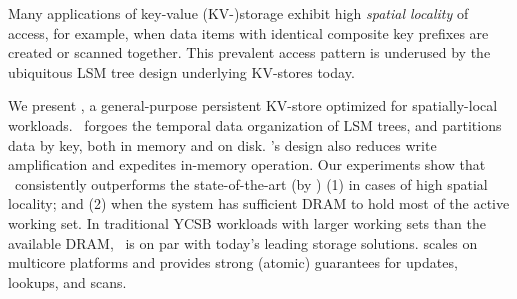 Many applications of key-value (KV-)storage exhibit high \emph{spatial locality}
of access, for example, when data items with identical composite key prefixes are created or scanned together.  
This prevalent access pattern is underused by the ubiquitous LSM tree design underlying KV-stores today.

We present \sys, a general-purpose persistent KV-store optimized for spatially-local workloads. 
\sys\ forgoes the temporal data organization of LSM trees, and partitions data by key, both in memory and on disk. 
%
\sys's design also reduces write amplification and expedites in-memory operation.
Our experiments show that \sys\ consistently outperforms the state-of-the-art (by  )
(1)  in cases of high spatial locality; and (2) when the system has sufficient DRAM to hold most of the active working set. 
In traditional YCSB workloads with larger working sets than the available  DRAM, \sys\ is on par with 
today's leading storage solutions.
\sys\/ scales on multicore platforms and provides strong (atomic) guarantees for updates, lookups, and scans. 
